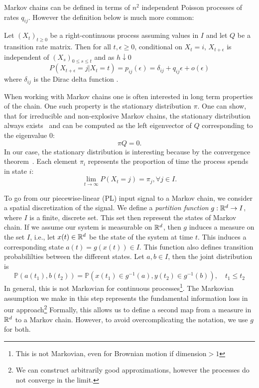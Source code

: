 Markov chains can be defined in terms of $n^2$ independent Poisson processes
of rates $q_{ij}$. However the definition below is much more common:%
\begin{defn}
	\label{def:ctmc}
	Let $(X_t)_{t \ge 0}$ be a right-continuous process assuming values in $I$ and let $Q$
	be a transition rate matrix. Then for all $t, \epsilon \ge 0$, conditional on $X_t = i$,
	$X_{t+\epsilon}$ is independent of $(X_s)_{0 \le s \le t}$ and as $h \downarrow 0$
	\begin{equation}
		\nonumber
		P(X_{t+\epsilon} = j | X_t = t) = p_{ij}(\epsilon) = \delta_{ij} + q_{ij}\epsilon + o(\epsilon)
	\end{equation}
	where $\delta_{ij}$ is the Dirac delta function \cite{norris1998markov}.
\end{defn}
When working with Markov
chains one is often interested in long term properties of the chain. One such property is the
stationary distribution $\pi$. One can show, that for irreducible and non-explosive Markov chains,
the stationary distribution always exists~\cite{norris1998markov} and can be computed as the left eigenvector of $Q$ 
corresponding to the eigenvalue $0$:
\begin{equation}
	\nonumber
	\pi Q = 0.
\end{equation}
In our case, the stationary distribution is interesting because by the convergence theorem~\cite{aldous-fill-2014}.
Each element $\pi_i$ represents the proportion of time the process spends in state $i$:
\begin{equation}
	\nonumber
	\lim\limits_{t \rightarrow \infty} P(X_t = j) = \pi_j, \forall j \in I.
\end{equation}

To go from our piecewise-linear (PL) input signal to a Markov chain, we consider a spatial discretization of the signal.
We define a \emph{partition function} $g:\mathbb{R}^d\rightarrow I$, where $I$ is a finite, discrete set. This set then represent the states of Markov chain. If we assume our system is measurable on $\mathbb{R}^d$, then $g$ induces a measure on the set $I$, i.e., let $x(t)\in \mathbb{R}^d$ be the state of the system at time $t$. This induces a corresponding  state $a(t) = g(x(t)) \in I$. This function also defines transition probabililties between the different states. Let $a,b\in I$, then the joint distribution is
    $$\mathbb{P}(a(t_1),b(t_2)) = \mathbb{P}(x(t_1)\in g^{-1}(a), y(t_2) \in g^{-1}(b)), 	 \quad t_1\leq t_2$$
 In general, this is not Markovian for continuous processes\footnote{This is not Markovian, even for Brownian motion if dimension$>1$ }. The Markovian assumption we make in this step represents the fundamental information loss in our approach\footnote{We can construct arbitrarily good approximations, however the processes do not converge in the limit.}
Formally, this allows us to define a second map from a measure in $\mathbb{R}^d$ to a Markov chain. However, to avoid overcomplicating the notation, we use $g$ for both. 

